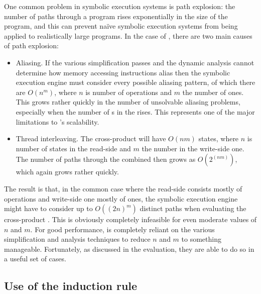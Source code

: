 One common problem in symbolic execution systems is path explosion:
the number of paths through a program rises exponentially in the size
of the program, and this can prevent na\"ive symbolic execution
systems from being applied to realistically large programs.  In the
case of \technique, there are two main causes of path explosion:

\begin{itemize}
\item
  Aliasing.  If the various simplification passes and the dynamic
  analysis cannot determine how memory accessing instructions alias
  then the symbolic execution engine must consider every possible
  aliasing pattern, of which there are $O(n^m)$, where $n$ is number
  of  operations and $m$ the number of  ones.
  This grows rather quickly in the number of unsolvable aliasing
  problems, especially when the number of s in the
  {\StateMachine} rises.  This represents one of the major limitations
  to \technique's scalability.
\item
  Thread interleaving.  The cross-product {\StateMachine} will have
  $O(nm)$ states, where $n$ is number of states in the read-side
  {\StateMachine} and $m$ the number in the write-side one.  The
  number of paths through the combined {\StateMachine} then grows as
  $O(2^(nm))$, which again grows rather quickly.
\end{itemize}

The result is that, in the common case where the read-side
{\StateMachine} consists mostly of  operations and
write-side one mostly of  ones, the symbolic execution
engine might have to consider up to $O((2n)^m)$ distinct paths when
evaluating the cross-product {\StateMachine}.  This is obviously
completely infeasible for even moderate values of $n$ and $m$.  For
good performance, {\technique} is completely reliant on the various
simplification and analysis techniques to reduce $n$ and $m$ to
something manageable.  Fortunately, as discussed in the evaluation,
they are able to do so in a useful set of cases.

\subsection{Use of the induction rule}

